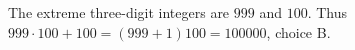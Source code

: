 The extreme three-digit integers are $999$ and $100$. Thus $999\cdot 100+100=(999+1)100=\boxed{100000}$, choice B.
